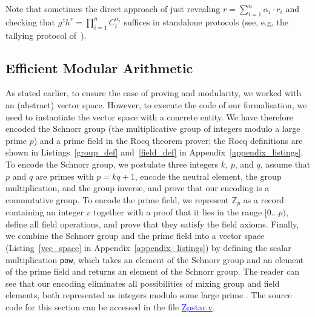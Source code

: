 \documentclass[sigconf,anonymous,review]{acmart}
\begin{document}
Note that sometimes the direct approach of just revealing $r=\sum_{i=1}^{n} \alpha_i \cdot r_i$ and checking that $g^z h^r = \prod_{i=1}^n C_i^{\alpha_i}$ suffices in standalone protocols (see, e.g, the tallying protocol of~\cite{CFSY96}).

\subsection{Efficient Modular Arithmetic}\label{eff_mod_arith}
As stated earlier, to ensure the ease of proving and modularity, we worked with an (abstract) vector space. However, to execute the code of our formalisation, we need to instantiate the vector space with a concrete entity. We have therefore encoded the Schnorr group \cite{schnorr1991efficient} (the multiplicative group of integers modulo a large prime $p$) and a prime field in the Rocq theorem prover; the Rocq definitions are shown in Listings~\ref{group_def} and~\ref{field_def} in Appendix~\ref{appendix_listings}. To encode the Schnorr group, we postulate three integers $k$, $p$, and $q$, assume that $p$ and $q$ are primes with $p = k q + 1$, encode the neutral element, the group multiplication, and the group inverse, and prove that our encoding is a commutative group. To encode the prime field, we represent $\mathbb{Z}_p$ as a record containing an integer $v$ together with a proof that it lies in the range $[0 \ldots p)$, define all field operations, and prove that they satisfy the field axioms. Finally, we combine the Schnorr group and the prime field into a vector space (Listing~\ref{vec_space} in Appendix~\ref{appendix_listings}) by defining the scalar multiplication \texttt{pow}, which takes an element of the Schnorr group and an element of the prime field and returns an element of the Schnorr group. The reader can see that our encoding eliminates all possibilities of mixing group and field elements, both represented as integers modulo some large prime \cite{10.1007/978-3-662-63958-0_24}. The source code for this section can be accessed in the file \href{https://anonymous.4open.science/r/SigmaProtocol-EBA5/src/Utility/Zpstar.v}{\textcolor{blue}{Zpstar.v}}.
\end{document}
